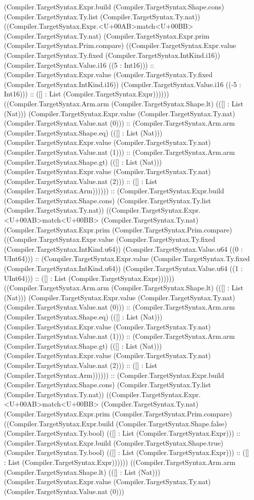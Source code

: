 \documentclass[11pt]{article}
\begin{document}
(Compiler.TargetSyntax.Expr.build (Compiler.TargetSyntax.Shape.cons) (Compiler.TargetSyntax.Ty.list (Compiler.TargetSyntax.Ty.nat)) ((Compiler.TargetSyntax.Expr.<U+00AB>match<U+00BB> (Compiler.TargetSyntax.Ty.nat) (Compiler.TargetSyntax.Expr.prim (Compiler.TargetSyntax.Prim.compare) ((Compiler.TargetSyntax.Expr.value (Compiler.TargetSyntax.Ty.fixed (Compiler.TargetSyntax.IntKind.i16)) (Compiler.TargetSyntax.Value.i16 ((5 : Int16))) :: (Compiler.TargetSyntax.Expr.value (Compiler.TargetSyntax.Ty.fixed (Compiler.TargetSyntax.IntKind.i16)) (Compiler.TargetSyntax.Value.i16 ((-5 : Int16))) :: ([] : List (Compiler.TargetSyntax.Expr)))))) ((Compiler.TargetSyntax.Arm.arm (Compiler.TargetSyntax.Shape.lt) (([] : List (Nat))) (Compiler.TargetSyntax.Expr.value (Compiler.TargetSyntax.Ty.nat) (Compiler.TargetSyntax.Value.nat (0))) :: (Compiler.TargetSyntax.Arm.arm (Compiler.TargetSyntax.Shape.eq) (([] : List (Nat))) (Compiler.TargetSyntax.Expr.value (Compiler.TargetSyntax.Ty.nat) (Compiler.TargetSyntax.Value.nat (1))) :: (Compiler.TargetSyntax.Arm.arm (Compiler.TargetSyntax.Shape.gt) (([] : List (Nat))) (Compiler.TargetSyntax.Expr.value (Compiler.TargetSyntax.Ty.nat) (Compiler.TargetSyntax.Value.nat (2))) :: ([] : List (Compiler.TargetSyntax.Arm)))))) :: (Compiler.TargetSyntax.Expr.build (Compiler.TargetSyntax.Shape.cons) (Compiler.TargetSyntax.Ty.list (Compiler.TargetSyntax.Ty.nat)) ((Compiler.TargetSyntax.Expr.<U+00AB>match<U+00BB> (Compiler.TargetSyntax.Ty.nat) (Compiler.TargetSyntax.Expr.prim (Compiler.TargetSyntax.Prim.compare) ((Compiler.TargetSyntax.Expr.value (Compiler.TargetSyntax.Ty.fixed (Compiler.TargetSyntax.IntKind.u64)) (Compiler.TargetSyntax.Value.u64 ((0 : UInt64))) :: (Compiler.TargetSyntax.Expr.value (Compiler.TargetSyntax.Ty.fixed (Compiler.TargetSyntax.IntKind.u64)) (Compiler.TargetSyntax.Value.u64 ((1 : UInt64))) :: ([] : List (Compiler.TargetSyntax.Expr)))))) ((Compiler.TargetSyntax.Arm.arm (Compiler.TargetSyntax.Shape.lt) (([] : List (Nat))) (Compiler.TargetSyntax.Expr.value (Compiler.TargetSyntax.Ty.nat) (Compiler.TargetSyntax.Value.nat (0))) :: (Compiler.TargetSyntax.Arm.arm (Compiler.TargetSyntax.Shape.eq) (([] : List (Nat))) (Compiler.TargetSyntax.Expr.value (Compiler.TargetSyntax.Ty.nat) (Compiler.TargetSyntax.Value.nat (1))) :: (Compiler.TargetSyntax.Arm.arm (Compiler.TargetSyntax.Shape.gt) (([] : List (Nat))) (Compiler.TargetSyntax.Expr.value (Compiler.TargetSyntax.Ty.nat) (Compiler.TargetSyntax.Value.nat (2))) :: ([] : List (Compiler.TargetSyntax.Arm)))))) :: (Compiler.TargetSyntax.Expr.build (Compiler.TargetSyntax.Shape.cons) (Compiler.TargetSyntax.Ty.list (Compiler.TargetSyntax.Ty.nat)) ((Compiler.TargetSyntax.Expr.<U+00AB>match<U+00BB> (Compiler.TargetSyntax.Ty.nat) (Compiler.TargetSyntax.Expr.prim (Compiler.TargetSyntax.Prim.compare) ((Compiler.TargetSyntax.Expr.build (Compiler.TargetSyntax.Shape.false) (Compiler.TargetSyntax.Ty.bool) (([] : List (Compiler.TargetSyntax.Expr))) :: (Compiler.TargetSyntax.Expr.build (Compiler.TargetSyntax.Shape.true) (Compiler.TargetSyntax.Ty.bool) (([] : List (Compiler.TargetSyntax.Expr))) :: ([] : List (Compiler.TargetSyntax.Expr)))))) ((Compiler.TargetSyntax.Arm.arm (Compiler.TargetSyntax.Shape.lt) (([] : List (Nat))) (Compiler.TargetSyntax.Expr.value (Compiler.TargetSyntax.Ty.nat) (Compiler.TargetSyntax.Value.nat (0))) 
\end{document}
